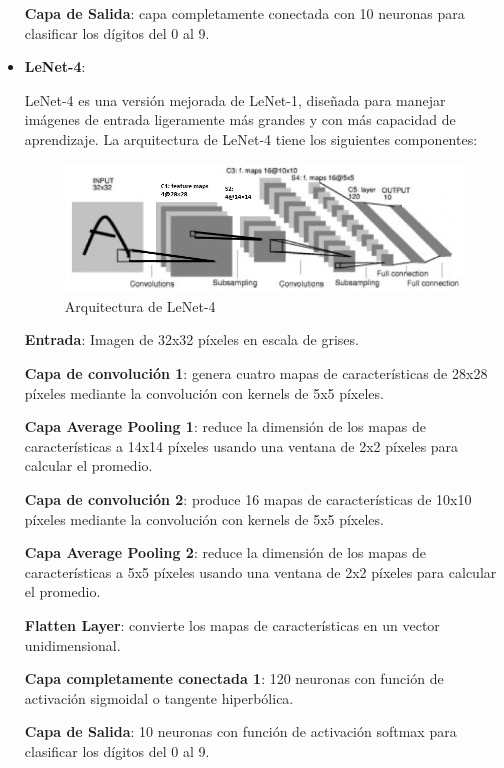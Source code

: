 \begin{itemize}
    \textbf{Capa de Salida}: capa completamente conectada con 10 neuronas
    para clasificar los dígitos del 0 al 9.

    \item \textbf{LeNet-4}:
    
    LeNet-4 es una versión mejorada de LeNet-1, diseñada para manejar 
    imágenes de entrada ligeramente más grandes y con más capacidad 
    de aprendizaje. La arquitectura de LeNet-4 tiene los siguientes 
    componentes:

    \begin{figure}[htbp]
        \centering
        \includegraphics[width=\linewidth]{src/figures/lenet_4.png}
        \caption{Arquitectura de LeNet-4 \cite{Lenet_4}}
        \label{fig:lenet-4}
    \end{figure}

    \textbf{Entrada}: Imagen de 32x32 píxeles en escala de grises.

    \textbf{Capa de convolución 1}: genera cuatro mapas de 
    características de 28x28 píxeles mediante la convolución con
    kernels de 5x5 píxeles.

    \textbf{Capa Average Pooling 1}: reduce la dimensión de los mapas
    de características a 14x14 píxeles usando una ventana de 2x2 píxeles
    para calcular el promedio.

    \textbf{Capa de convolución 2}: produce 16 mapas de características
    de 10x10 píxeles mediante la convolución con kernels de 5x5 píxeles.

    \textbf{Capa Average Pooling 2}: reduce la dimensión de los mapas
    de características a 5x5 píxeles usando una ventana de 2x2 píxeles
    para calcular el promedio. 

    \textbf{Flatten Layer}: convierte los mapas de características en
    un vector unidimensional.

    \textbf{Capa completamente conectada 1}: 120 neuronas con función
    de activación sigmoidal o tangente hiperbólica.

    \textbf{Capa de Salida}: 10 neuronas con función
    de activación softmax para clasificar los dígitos del 0 al 9.


\end{itemize}
